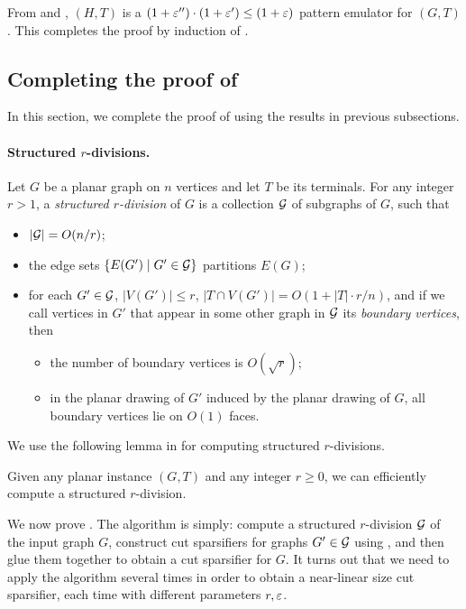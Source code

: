 From  and , $(H,T)$ is a $(1+{\varepsilon}'')\cdot (1+{\varepsilon}')\le (1+{\varepsilon})$ pattern emulator for $(G,T)$. This completes the proof by induction of .




\subsection{Completing the proof of }

In this section, we complete the proof of  using the results in previous subsections.

\paragraph{Structured $r$-divisions.} Let $G$ be a planar graph on $n$ vertices and let $T$ be its terminals. For any integer $r>1$, a \emph{structured $r$-division} of $G$ is a collection ${\mathcal{G}}$ of subgraphs of $G$, such that
\begin{itemize}
\item $|{\mathcal{G}}|=O(n/r)$;
\item the edge sets $\left\{ E(G')\mid G'\in {\mathcal{G}} \right\}$ partitions $E(G)$;
\item for each $G'\in {\mathcal{G}}$, $|V(G')|\le r$, $|T\cap V(G')|=O(1+|T|\cdot r/n)$, and if we call vertices in $G'$ that appear in some other graph in ${\mathcal{G}}$ its \emph{boundary vertices}, then
\begin{itemize}
\item the number of boundary vertices is $O(\sqrt{r})$;
\item in the planar drawing of $G'$ induced by the planar drawing of $G$, all boundary vertices lie on $O(1)$ faces.
\end{itemize}
\end{itemize}

We use the following lemma in \cite{chang2022near} for computing structured $r$-divisions.

\begin{lemma}
\label{lem: r-division}
Given any planar instance $(G,T)$ and any integer $r\ge 0$, we can efficiently compute a structured $r$-division.
\end{lemma}

We now prove . The algorithm is simply: compute a structured $r$-division ${\mathcal{G}}$ of the input graph $G$, construct cut sparsifiers for graphs $G'\in {\mathcal{G}}$ using , and then glue them together to obtain a cut sparsifier for $G$.
It turns out that we need to apply the algorithm several times in order to obtain a near-linear size cut sparsifier, each time with different parameters $r,{\varepsilon}$.

